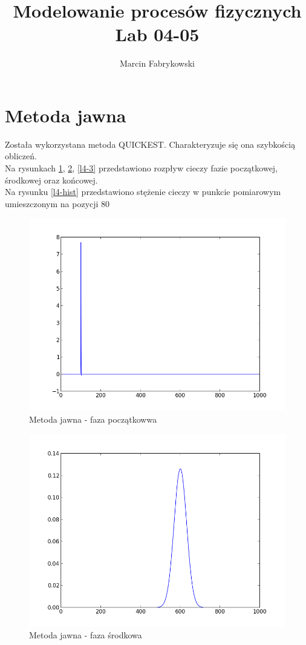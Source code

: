 \documentclass[a4paper,12pt]{article}
\author{Marcin Fabrykowski}
\title{Modelowanie procesów fizycznych\\Lab 04-05}
\begin{document}
	\maketitle
	\newpage
	\section{Metoda jawna}
	Została wykorzystana metoda QUICKEST. Charakteryzuje się ona szybkością obliczeń.\\
	Na rysunkach \ref{l4-1}, \ref{l4-2}, \ref{l4-3} przedstawiono rozpływ cieczy fazie początkowej, środkowej oraz końcowej.\\
	Na rysunku \ref{l4-hist} przedstawiono stężenie cieczy w punkcie pomiarowym umieszczonym na pozycji 80
	\begin{figure}
	\hspace{-100px}
	\includegraphics{plots1/00000}
	\caption{Metoda jawna - faza początkowwa}
	\label{l4-1}
	\end{figure}
	\begin{figure}
	\hspace{-100px}
	\includegraphics{plots1/00100}
	\caption{Metoda jawna - faza środkowa}
	\label{l4-2}
	\end{figure}
\end{document}
